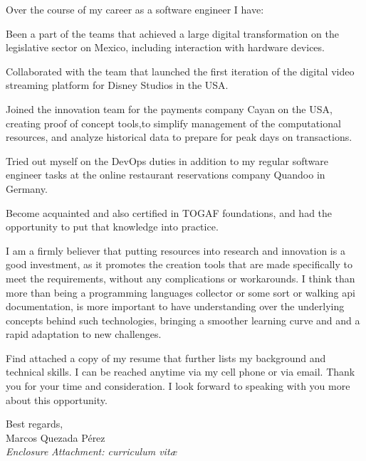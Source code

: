 \documentclass[a4paper,nonstopmode,9.5pt]{article}
\begin{document}
Over the course of my career as a software engineer I have:

Been a part of the teams that achieved a large digital transformation on the legislative sector on Mexico, including interaction with hardware devices.

Collaborated with the team that launched the first iteration of the digital video streaming platform for Disney Studios in the USA.

Joined the innovation team for the payments company Cayan on the USA, creating proof of concept tools,to simplify management of the computational resources, and analyze historical data to prepare for peak days on transactions.

Tried out myself on the DevOps duties in addition to my regular software engineer tasks at the online restaurant reservations company Quandoo in Germany.

Become acquainted and also certified in TOGAF foundations, and had the opportunity to put that knowledge into practice.


I am a firmly believer that putting resources into research and innovation is a good investment, as it promotes the creation tools that are made specifically to meet the requirements, without any complications or workarounds. I think than more than being a programming languages
collector or some sort or walking api documentation, is more important to have understanding over the underlying concepts behind such technologies, bringing a smoother learning curve and and a rapid adaptation to new challenges.

Find attached a copy of my resume that further lists my background and technical skills. I can be reached anytime via my cell phone or via email. Thank you for your time and consideration. I look forward to speaking with you more about this opportunity.

Best regards,
%
{\\ Marcos Quezada Pérez}\\
%
\vfill%
{\slshape Enclosure}
{\slshape Attachment: curriculum vit\ae{}}
\end{document}
